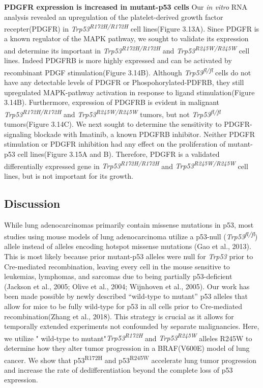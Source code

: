 \textbf{PDGFR expression is increased in mutant-p53 cells}
Our \emph{in vitro} RNA analysis revealed an upregulation of the platelet-derived growth factor recepter(PDGFR) in \emph{Trp53\textsuperscript{R172H/R172H}} cell lines(Figure 3.13A). Since PDGFR is a known regulator of the MAPK pathway, we sought to validate its expression and determine its important in \emph{Trp53\textsuperscript{R172H/R172H}} and \emph{Trp53\textsuperscript{R245W/R245W}} cell lines. Indeed PDGFRB is more highly expressed and can be activated by recombinant PDGF stimulation(Figure 3.14B). Although \emph{Trp53\textsuperscript{fl/fl}} cells do not have any detectable levels of PDGFR or Phospohorylated-PDFRB, they still upregulated MAPK-pathway activation in response to ligand stimulation(Figure 3.14B). Furthermore, expression of PDGFRB is evident in malignant \emph{Trp53\textsuperscript{R172H/R172H}} and \emph{Trp53\textsuperscript{R245W/R245W}} tumors, but not \emph{Trp53\textsuperscript{fl/fl}} tumors(Figure 3.14C). We next sought to determine the sensitivity to PDGFR-signaling blockade with Imatinib, a known PDGFRB inhibitor. Neither PDGFR stimulation or PDGFR inhibition had any effect on the proliferation of mutant-p53 cell lines(Figure 3.15A and B). Therefore, PDGFR is a validated differentially expressed gene in \emph{Trp53\textsuperscript{R172H/R172H}} and \emph{Trp53\textsuperscript{R245W/R245W}} cell lines, but is not important for its growth.

\hypertarget{discussion-1}{%
\subsection{Discussion}\label{discussion-1}}

While lung adenocarcinomas primarily contain missense mutations in p53, most studies using mouse models of lung adenocarcinoma utilize a p53-null (\emph{Trp53\textsuperscript{fl/fl}}) allele instead of alleles encoding hotspot missense mutations (Gao et al., 2013). This is most likely because prior mutant-p53 alleles were null for \emph{Trp53} prior to Cre-mediated recombination, leaving every cell in the mouse sensitive to leukemias, lymphomas, and sarcomas due to being partially p53-deficient (Jackson et al., 2005; Olive et al., 2004; Wijnhoven et al., 2005). Our work has been made possible by newly described ``wild-type to mutant'' p53 alleles that allow for mice to be fully wild-type for p53 in all cells prior to Cre-mediated recombination(Zhang et al., 2018). This strategy is crucial as it allows for temporally extended experiments not confounded by separate malignancies. Here, we utilize " wild-type to mutant"\emph{Trp53\textsuperscript{R172H}} and \emph{Trp53\textsuperscript{R245W}} alleles R245W to determine how they alter tumor progression in a BRAF(V600E) model of lung cancer. We show that p53\textsuperscript{R172H} and p53\textsuperscript{R245W} accelerate lung tumor progression and increase the rate of dedifferentiation beyond the complete loss of p53 expression.

